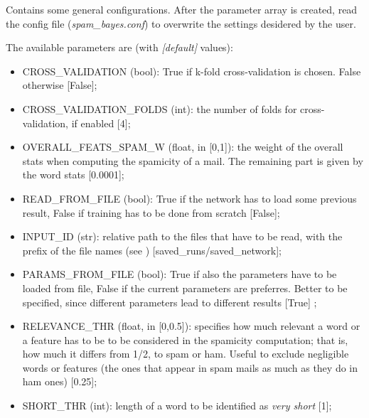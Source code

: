 \documentclass[letterpaper,10pt,english]{sphinxmanual}
\begin{document}
\begin{fulllineitems}
\label{index:config.Config}
Contains some general configurations. After the parameter array is created,
read the config file (\emph{spam\_bayes.conf}) to overwrite the settings
desidered by the user.

The available parameters are (with \emph{{[}default{]}} values):
\begin{itemize}
\item {} 
CROSS\_VALIDATION (bool): True if k-fold cross-validation is chosen.        False otherwise {[}False{]};

\item {} 
CROSS\_VALIDATION\_FOLDS (int): the number of folds for        cross-validation, if enabled {[}4{]};

\item {} 
OVERALL\_FEATS\_SPAM\_W (float, in {[}0,1{]}): the weight of the overall stats        when computing the spamicity of a mail. The remaining part is given by        the word stats {[}0.0001{]};

\item {} 
READ\_FROM\_FILE (bool): True if the network has to load some previous        result, False if training has to be done from scratch {[}False{]};

\item {} 
INPUT\_ID (str): relative path to the files that have to be read, with the        prefix of the file names (see {\hyperref[index:naive_bayes.Bayes.read_bayes]{}})        {[}saved\_runs/saved\_network{]};

\item {} 
PARAMS\_FROM\_FILE (bool): True if also the parameters have to be loaded from file,        False if the current parameters are preferres. Better to be specified,        since different parameters lead to different results {[}True{]} ;

\item {} 
RELEVANCE\_THR (float, in {[}0,0.5{]}): specifies how much relevant a word or        a feature has to be to be considered in the spamicity computation; that is,        how much it differs from 1/2, to spam or ham. Useful to exclude negligible        words or features (the ones that appear in spam mails as much as they do in            ham ones) {[}0.25{]};

\item {} 
SHORT\_THR (int): length of a word to be identified as \emph{very short} {[}1{]};


\end{itemize}
\end{fulllineitems}
\end{document}
